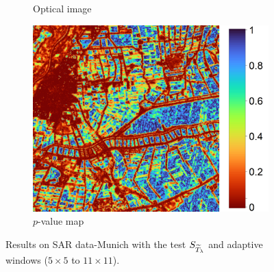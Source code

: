 \documentclass[
  lettersize  journal,
]{IEEEtran}%
\begin{document}
\begin{figure}[hbt]
\begin{subfigure}{0.235\textwidth}
        \caption{Optical image}
        \label{fig:munich-o}
    \end{subfigure}
   \hspace{0.001\textwidth}
    \begin{subfigure}{0.315\textwidth}
        \includegraphics[width=\linewidth]{./Figures/p-values_munich50.png}
        \caption{$p$-value map   }
        \label{fig:munichp}
    \end{subfigure}
    \caption{Results on SAR data-Munich with the test $\small{S_{\widetilde{T}_{\lambda}}}$ and adaptive windows ($5\times5$ to $11\times11$). }
    \label{fig:munich}
\end{figure}
\end{document}
